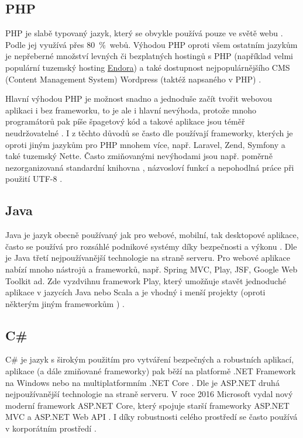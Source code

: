         \subsection{PHP}
        PHP je slabě typovaný jazyk, který se obvykle používá pouze ve světě webu \cite{tech-python1}. Podle \cite{tech-php1} jej využívá přes 80~\%~webů. Výhodou PHP oproti všem ostatním jazykům je nepřeberné množství levných či bezplatných hostingů s PHP \cite{tech-python4} (například velmi populární tuzemský hosting \href{https://www.endora.cz/}{Endora}) a také dostupnost nejpopulárnějšího CMS (Content Management System) Wordpress (taktéž napsaného v PHP) \cite{tech-python2}.
        
        Hlavní výhodou PHP je možnost snadno a jednoduše začít tvořit webovou aplikaci i bez frameworku, to je ale i hlavní nevýhoda, protože mnoho programátorů pak píše špagetový kód a takové aplikace jsou téměř neudržovatelné \cite{tech-php2}. I z těchto důvodů se často dle \cite{tech1} používají frameworky, kterých je oproti jiným jazykům pro PHP mnohem více, např. Laravel, Zend, Symfony a také tuzemský Nette. Často zmiňovanými nevýhodami jsou např. poměrně nezorganizovaná standardní knihovna \cite{tech-python1}, názvosloví funkcí a nepohodlná práce při použití UTF-8 \cite{tech-php3}.
        
        \subsection{Java}
        Java je jazyk obecně používaný jak pro webové, mobilní, tak desktopové aplikace, často se používá pro rozsáhlé podnikové systémy díky bezpečnosti a výkonu \cite{tech2}. Dle \cite{tech-php1} je Java třetí nejpoužívanější technologie na straně serveru. Pro webové aplikace nabízí mnoho nástrojů a frameworků, např. Spring MVC, Play, JSF, Google Web Toolkit ad. Zde vyzdvihnu framework Play, který umožňuje stavět jednoduché aplikace v jazycích Java nebo Scala a je vhodný i menší projekty (oproti některým jiným frameworkům \cite{tech-java1}) \cite{tech-java2}.
        
        \subsection{C\#}
        C\# je jazyk s širokým použitím pro vytváření bezpečných a robustních aplikací, aplikace (a dále zmiňované frameworky) pak běží na platformě .NET Framework na Windows nebo na multiplatformním .NET Core \cite{tech-csharp1}. Dle \cite{tech-php1} je ASP.NET druhá nejpoužívanější technologie na straně serveru. V roce 2016 Microsoft vydal nový moderní framework ASP.NET Core, který spojuje starší frameworky ASP.NET MVC a ASP.NET Web API \cite{tech-csharp1}. I díky robustnosti celého prostředí se často používá v korporátním prostředí \cite{tech-csharp3}. 
        
